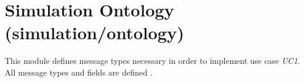 \section{Simulation Ontology (simulation/ontology)}
This module defines message types necessary in order to implement use case \textit{UC1}. All message types and fields are defined .